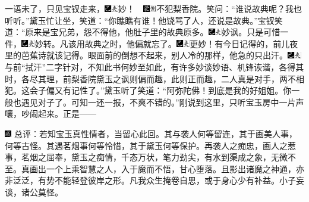 一语未了，只见宝钗走来，{\includegraphics[width=3mm]{../Images/00003}\includegraphics[width=3mm]{../Images/00012}\footnotesize \kaishu 妙！　\includegraphics[width=3mm]{../Images/00006}\includegraphics[width=3mm]{../Images/00011}\footnotesize \kaishu 不犯梨香院。}笑问：“谁说故典呢？我也听听。”黛玉忙让坐，笑道：“你瞧瞧有谁！他饶骂了人，还说是故典。”宝钗笑道：“原来是宝兄弟，怨不得他，他肚子里的故典原多。{\includegraphics[width=3mm]{../Images/00003}\includegraphics[width=3mm]{../Images/00012}\footnotesize \kaishu 妙讽。}只是可惜一件，{\includegraphics[width=3mm]{../Images/00003}\includegraphics[width=3mm]{../Images/00012}\footnotesize \kaishu 妙转。}凡该用故典之时，他偏就忘了。{\includegraphics[width=3mm]{../Images/00003}\includegraphics[width=3mm]{../Images/00012}\footnotesize \kaishu 更妙！}有今日记得的，前儿夜里的芭蕉诗就该记得。眼面前的倒想不起来，别人冷的那样，他急的只出汗。{\includegraphics[width=3mm]{../Images/00003}\includegraphics[width=3mm]{../Images/00012}\footnotesize \kaishu 与前“拭汗”二字针对，不知此书何妙至如此，有许多妙谈妙语、机锋诙谐，各得其时，各尽其理，前梨香院黛玉之讽则偏而趣，此则正而趣，二人真是对手，两不相犯。}这会子偏又有记性了。”黛玉听了笑道：“阿弥陀佛！到底是我的好姐姐。你一般也遇见对子了。可知一还一报，不爽不错的。”刚说到这里，只听宝玉房中一片声嚷，吵闹起来。正是------

{\includegraphics[width=3mm]{../Images/00005}  \kaishu 总评：若知宝玉真性情者，当留心此回。其与袭人何等留连，其于画美人事，何等古怪。其遇茗烟事何等怜惜，其于黛玉何等保护。再袭人之痴忠，画人之惹事，茗烟之屈奉，黛玉之痴情，千态万状，笔力劲尖，有水到渠成之象，无微不至。真画出一个上乘智慧之人，入于魔而不悟，甘心堕落。且影出诸魔之神通，亦非泛泛，有势不能轻登彼岸之形。凡我众生掩卷自思，或于身心少有补益。小子妄谈，诸公莫怪。}